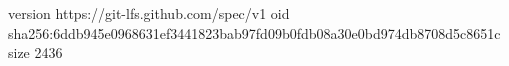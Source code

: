 version https://git-lfs.github.com/spec/v1
oid sha256:6ddb945e0968631ef3441823bab97fd09b0fdb08a30e0bd974db8708d5c8651c
size 2436
